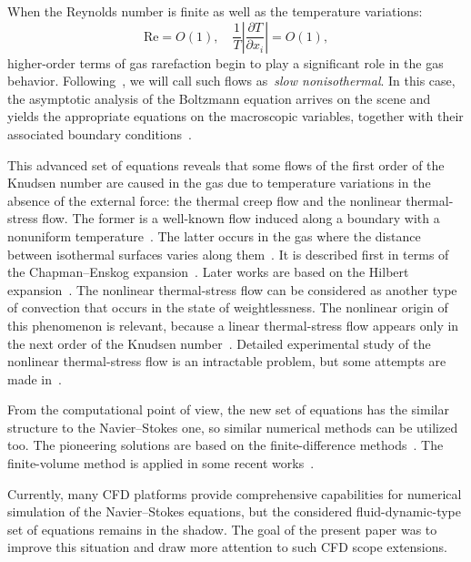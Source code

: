 \documentclass[smallextended, final]{svjour3} %
\newcommand{\pder}[2][]{\frac{\partial#1}{\partial#2}}
\begin{document}
When the Reynolds number is finite as well as the temperature variations:
\[ \mathrm{Re} = O(1), \quad \frac1T\left|\pder[T]{x_i}\right| = O(1), \]
higher-order terms of gas rarefaction begin to play a significant role in the gas behavior.
Following~\cite{Kogan1976}, we will call such flows as~\emph{slow nonisothermal}.
In this case, the asymptotic analysis of the Boltzmann equation arrives on the scene and
yields the appropriate equations on the macroscopic variables, together with
their associated boundary conditions~\cite{Sone2002, Sone2007}.

This advanced set of equations reveals that some flows of the first order of the Knudsen number
are caused in the gas due to temperature variations in the absence of the external force:
the thermal creep flow and the nonlinear thermal-stress flow.
The former is a well-known flow induced along a boundary
with a nonuniform temperature~\cite{Maxwell1879Stresses, Ohwada1989Creep}.
The latter occurs in the gas where the distance between isothermal surfaces varies along them~\cite{Kogan1976}.
It is described first in terms of the Chapman--Enskog expansion~\cite{Kogan1971}.
Later works are based on the Hilbert expansion~\cite{SoneBobylev96}.
The nonlinear thermal-stress flow can be considered as another type of convection
that occurs in the state of weightlessness.
The nonlinear origin of this phenomenon is relevant, because a linear thermal-stress flow
appears only in the next order of the Knudsen number~\cite{Sone1972Stress}.
Detailed experimental study of the nonlinear thermal-stress flow is an intractable problem,
but some attempts are made in~\cite{ExperimentsNTFS2003}.

From the computational point of view, the new set of equations has the similar structure
to the Navier--Stokes one, so similar numerical methods can be utilized too.
The pioneering solutions are based on the finite-difference
methods~\cite{SoneBobylev96, Aleksandrov2002Tube, Aleksandrov2008Particle}.
The finite-volume method is applied in some recent works~\cite{Laneryd2006, Laneryd2007}.

Currently, many CFD platforms provide comprehensive
capabilities for numerical simulation of the Navier--Stokes equations,
but the considered fluid-dynamic-type set of equations remains in the shadow.
The goal of the present paper was to improve this situation and
draw more attention to such CFD scope extensions.
\end{document}

